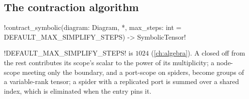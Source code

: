\subsection{The contraction algorithm}\label{sec:semantics-symbolic-algorithm}

\begin{signature}
\py!contract_symbolic(diagram: Diagram, *, max_steps: int = DEFAULT_MAX_SIMPLIFY_STEPS) -> SymbolicTensor!
\end{signature}
\noindent \py!DEFAULT_MAX_SIMPLIFY_STEPS! is $1024$ (\cref{ch:algebra}). A \bbox{} closed off from the rest contributes its scope's scalar to the power of its multiplicity; a node-scope \bbox{} meeting only the boundary, and a port-scope \bbox{} on spiders, become groups of a variable-rank tensor; a spider with a replicated port is summed over a shared index, which is eliminated when the entry pins it.

